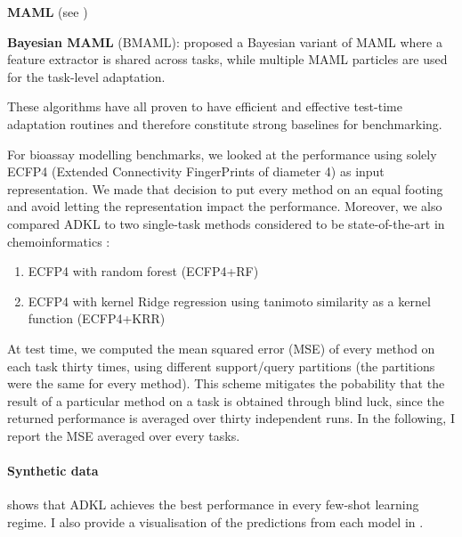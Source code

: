 \documentclass[11pt]{article}
\numberwithin{equation}{subsection}
\begin{document}
\textbf{MAML} (see )

\textbf{Bayesian MAML} (BMAML): \citet{kim2018bayesian} proposed a Bayesian variant of MAML where a feature extractor is shared across tasks, while multiple MAML particles are used for the task-level adaptation.

These algorithms have all proven to have efficient and effective test-time adaptation routines and therefore constitute strong baselines for benchmarking.

For bioassay modelling benchmarks, we looked at the performance using solely ECFP4 (Extended Connectivity FingerPrints of diameter 4) as input representation. We made that decision to put every method on an equal footing and avoid letting the representation impact the performance. Moreover, we also compared ADKL to two single-task methods considered to be state-of-the-art in chemoinformatics \citep{olier2018meta}:
\begin{enumerate}[noitemsep, label=\alph*)]
  \item ECFP4 with random forest (ECFP4+RF)
  \item ECFP4 with kernel Ridge regression using tanimoto similarity as a kernel function (ECFP4+KRR)
\end{enumerate}

At test time, we computed the mean squared error (MSE) of every method on each task thirty times, using different support/query partitions (the partitions were the same for every method). This scheme mitigates the pobability that the result of a particular method on a task is obtained through blind luck, since the returned performance is averaged over thirty independent runs. In the following, I report the MSE averaged over every tasks.

\paragraph{Synthetic data}

 shows that ADKL achieves the best performance in every few-shot learning regime. I also provide a visualisation of the predictions from each model in .
\end{document}
